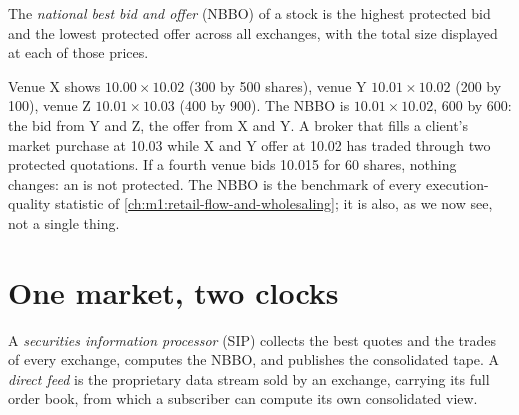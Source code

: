 \begin{definition}\label{def:m1:us-equity-market-structure:nbbo}
The \emph{national best bid and offer}
(NBBO) of a stock is the highest protected bid and the lowest protected
offer across all exchanges, with the total size displayed at each of those
prices.
\end{definition}

\begin{example}\label{ex:m1:us-equity-market-structure:nbbo}
Venue X shows $10.00 \times 10.02$ (300 by 500 shares), venue Y $10.01
\times 10.02$ (200 by 100), venue Z $10.01 \times 10.03$ (400 by 900). The
NBBO is $10.01 \times 10.02$, 600 by 600: the bid from Y and Z, the offer
from X and Y. A broker that fills a client's market purchase at 10.03 while
X and Y offer at 10.02 has traded through two protected quotations. If a
fourth venue bids 10.015 for 60 shares, nothing changes: an  is not
protected. The NBBO is the benchmark of every execution-quality statistic of
\cref{ch:m1:retail-flow-and-wholesaling}; it is also, as we now see, not a
single thing.
\end{example}

\section{One market, two clocks}

\begin{definition}\label{def:m1:us-equity-market-structure:sip}
A \emph{securities information processor}
(SIP) collects the best quotes and the trades of every exchange, computes the
NBBO, and publishes the consolidated tape. A
\emph{direct feed} is the proprietary data stream sold by
an exchange, carrying its full order book, from which a subscriber can
compute its own consolidated view.
\end{definition}


